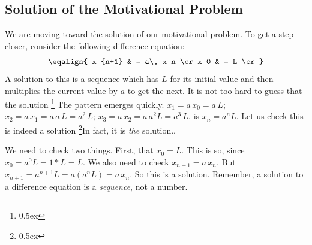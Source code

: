 \subsection{Solution of the Motivational Problem}
We are moving toward the solution of our motivational problem. To get a step 
closer, consider the following difference equation:
$$
\eqalign{
x_{n+1} & = a\, x_n \cr
x_0 & = L \cr
}
$$
A solution to this  is a sequence which has $L$ for 
its initial value and then multiplies the current value by $a$ to get the next.
It is not too hard to guess that the solution%
\footnote{\kern 0.5pt \raise 0.5ex \hbox{\dag}}%
{The pattern emerges quickly. $x_1 = a \,x_0 = a \,L$; $x_2 = a \,x_1 = a \, a \, L = a^2 \, L$; $x_3 = a \, x_2 = a \, a^2 L =
a^3\, L$.} is $x_n = a^n L$.
Let us check this is indeed a solution%
\footnote{\kern 0.5pt \raise 0.5ex \hbox{\ddag}}{In fact, it is {\it the\/} solution.}. 

We need to check two things. First, that 
$x_0 = L$. This is so, since $x_0 = a^0 L = 1 * L = L$. We also need 
to check $x_{n+1} = a\, x_n$. But $x_{n+1} = a^{n+1}L = a (a^n L) 
= a\, x_n$. So this is a solution. Remember, a solution to a difference 
equation is a {\it sequence\/}, not a number.

